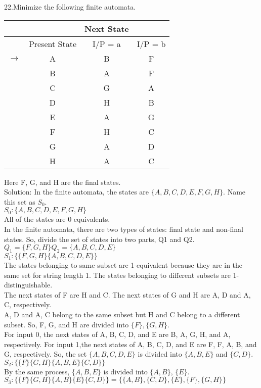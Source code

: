 \documentclass{article}
\begin{document}
22.Minimize the following finite automata.\\
\begin{center}
\begin{tabular}{rccc}
	\hline
	&&Next State\\
	\hline
	&Present State&I/P = a&I/P = b\\
	\hline
	$\rightarrow$&A&B&F\\
	&B&A&F\\
	&C&G&A\\
	&D&H&B\\
	&E&A&G\\
	&F&H&C\\
	&G&A&D\\
	&H&A&C\\
	\hline
\end{tabular}
\end{center}
Here F, G, and H are the final states.\\
Solution: In the finite automata, the states are $\{A, B, C, D, E, F, G, H\}$. Name this set as $S_0$.\\
$S_0: \{A, B, C, D, E, F, G, H\}$\\


All of the states are 0 equivalents.\\
In the finite automata, there are two types of states: final state and non-final states. So, divide the set of states into two parts, Q1 and Q2.\\
$Q_1 = \{F, G, H\} Q_2 = \{A, B, C, D, E\}$\\
$S_1: \{\{F, G, H\} \{A, B, C, D, E\}\}$\\
The states belonging to same subset are 1-equivalent because they are in the same set for string length 1. The states belonging to different subsets are 1-distinguishable.\\
The next states of F are H and C. The next states of G and H are A, D and A, C, respectively.\\
A, D and A, C belong to the same subset but H and C belong to a different subset. So, F, G, and H are divided into $\{F\}, \{G, H\}$.\\

For input 0, the next states of A, B, C, D, and E are B, A, G, H, and A, respectively. For input 1,the next states of A, B, C, D, and E are F, F, A, B, and G, respectively. So, the set $\{A, B, C, D, E\}$ is divided into $\{A, B, E\}$ and $\{C, D\}$.\\
             $S_2: \{\{F\} \{G, H\} \{A, B, E\} \{C, D\}\}$\\
By the same process, $\{A, B, E\}$ is divided into $\{A, B\}$, $\{E\}$.\\
$S_3: \{\{F\} \{G, H\} \{A, B\} \{E\} \{C, D\}\} = \{\{A, B\}, \{C, D\}, \{E\}, \{F\}, \{G, H\}\}$\\
\end{document}
